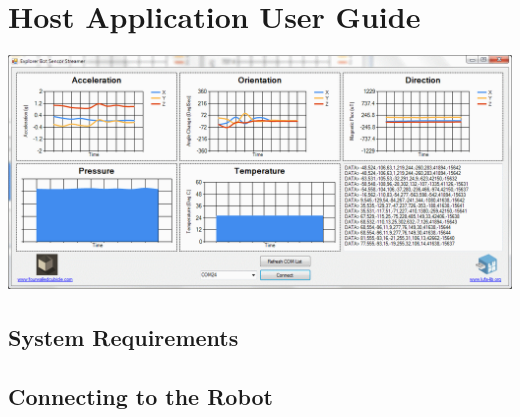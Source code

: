 \chapter{Host Application User Guide}
\label{Appendix E}

\begin{center}
	\includegraphics[width=150mm]{./Figures/SensorDataApp.png}
\end{center}


\section{System Requirements}


\section{Connecting to the Robot}

